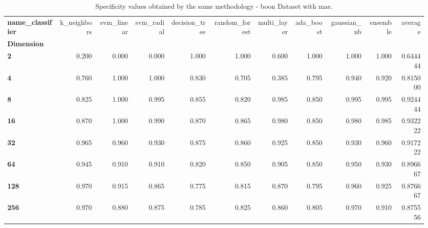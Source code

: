 \begin{table}
\centering
\caption{Specificity values obtained by the same methodology - boon Dataset with mae.}
\label{specificity_boon_mae-reproduction}
\begin{tabular}{lrrrrrrrrrr}
\toprule
\textbf{name\_classifier} &  k\_neighbors &  svm\_linear &  svm\_radial &  decision\_tree &  random\_forest &  multi\_layer &  ada\_boost &  gaussian\_nb &  ensemble &   average \\
\textbf{Dimension} &              &             &             &                &                &              &            &              &           &           \\
\midrule
\textbf{2        } &        0.200 &       0.000 &       0.000 &          1.000 &          1.000 &        0.600 &      1.000 &        1.000 &     1.000 &  0.644444 \\
\textbf{4        } &        0.760 &       1.000 &       1.000 &          0.830 &          0.705 &        0.385 &      0.795 &        0.940 &     0.920 &  0.815000 \\
\textbf{8        } &        0.825 &       1.000 &       0.995 &          0.855 &          0.820 &        0.985 &      0.850 &        0.995 &     0.995 &  0.924444 \\
\textbf{16       } &        0.870 &       1.000 &       0.990 &          0.870 &          0.865 &        0.980 &      0.850 &        0.980 &     0.985 &  0.932222 \\
\textbf{32       } &        0.965 &       0.960 &       0.930 &          0.875 &          0.860 &        0.925 &      0.850 &        0.930 &     0.960 &  0.917222 \\
\textbf{64       } &        0.945 &       0.910 &       0.910 &          0.820 &          0.850 &        0.905 &      0.850 &        0.950 &     0.930 &  0.896667 \\
\textbf{128      } &        0.970 &       0.915 &       0.865 &          0.775 &          0.815 &        0.870 &      0.795 &        0.960 &     0.925 &  0.876667 \\
\textbf{256      } &        0.970 &       0.880 &       0.875 &          0.785 &          0.825 &        0.860 &      0.805 &        0.970 &     0.910 &  0.875556 \\
\bottomrule
\end{tabular}
\end{table}
